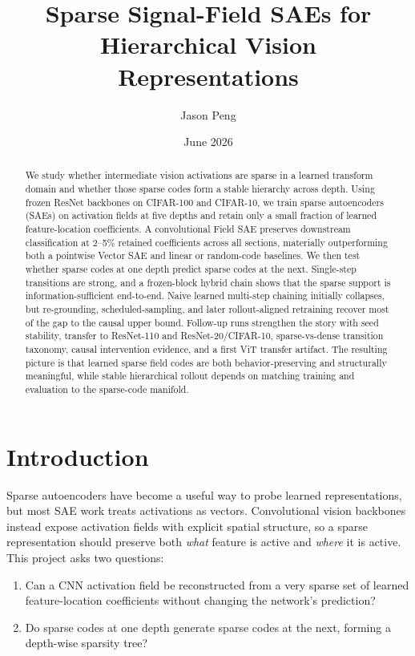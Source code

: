 \documentclass[10pt,twocolumn]{article}
\title{Sparse Signal-Field SAEs for Hierarchical Vision Representations}
\author{Jason Peng}
\date{June 2026}
\begin{document}
\maketitle

\begin{abstract}
We study whether intermediate vision activations are sparse in a learned transform domain and whether those sparse codes form a stable hierarchy across depth. Using frozen ResNet backbones on CIFAR-100 and CIFAR-10, we train sparse autoencoders (SAEs) on activation fields at five depths and retain only a small fraction of learned feature-location coefficients. A convolutional Field SAE preserves downstream classification at 2--5\% retained coefficients across all sections, materially outperforming both a pointwise Vector SAE and linear or random-code baselines. We then test whether sparse codes at one depth predict sparse codes at the next. Single-step transitions are strong, and a frozen-block hybrid chain shows that the sparse support is information-sufficient end-to-end. Naive learned multi-step chaining initially collapses, but re-grounding, scheduled-sampling, and later rollout-aligned retraining recover most of the gap to the causal upper bound. Follow-up runs strengthen the story with seed stability, transfer to ResNet-110 and ResNet-20/CIFAR-10, sparse-vs-dense transition taxonomy, causal intervention evidence, and a first ViT transfer artifact. The resulting picture is that learned sparse field codes are both behavior-preserving and structurally meaningful, while stable hierarchical rollout depends on matching training and evaluation to the sparse-code manifold.
\end{abstract}

\section{Introduction}
Sparse autoencoders have become a useful way to probe learned representations, but most SAE work treats activations as vectors. Convolutional vision backbones instead expose activation fields with explicit spatial structure, so a sparse representation should preserve both \emph{what} feature is active and \emph{where} it is active. This project asks two questions:
\begin{enumerate}[leftmargin=1.2em]
  \item Can a CNN activation field be reconstructed from a very sparse set of learned feature-location coefficients without changing the network's prediction?
  \item Do sparse codes at one depth generate sparse codes at the next, forming a depth-wise sparsity tree?
\end{enumerate}
\end{document}
